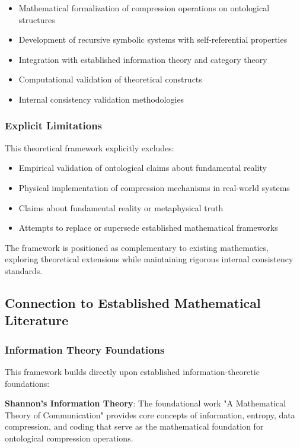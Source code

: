 \begin{itemize}
\item Mathematical formalization of compression operations on ontological structures
\item Development of recursive symbolic systems with self-referential properties
\item Integration with established information theory and category theory
\item Computational validation of theoretical constructs
\item Internal consistency validation methodologies
\end{itemize}

\subsubsection{Explicit Limitations}
This theoretical framework explicitly excludes:

\begin{itemize}
\item Empirical validation of ontological claims about fundamental reality
\item Physical implementation of compression mechanisms in real-world systems
\item Claims about fundamental reality or metaphysical truth
\item Attempts to replace or supersede established mathematical frameworks
\end{itemize}

The framework is positioned as complementary to existing mathematics, exploring theoretical extensions while maintaining rigorous internal consistency standards.

\subsection{Connection to Established Mathematical Literature}

\subsubsection{Information Theory Foundations}
This framework builds directly upon established information-theoretic foundations:

\textbf{Shannon's Information Theory}: The foundational work "A Mathematical Theory of Communication" provides core concepts of information, entropy, data compression, and coding that serve as the mathematical foundation for ontological compression operations.

